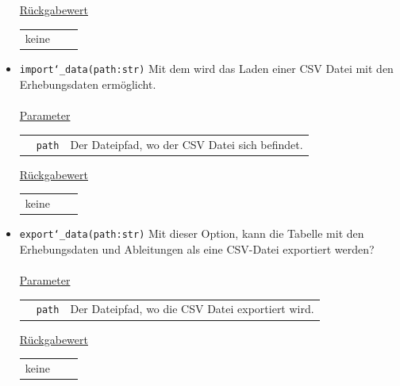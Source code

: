 \documentclass{article}
\begin{document}
\begin{itemize}
\underline{{Rückgabewert}}
\begin{tabular}{lll}
 keine \\
\end{tabular}

\item \texttt{import\char`_data(path:str)} \newline Mit dem wird das Laden einer CSV Datei mit den Erhebungsdaten ermöglicht.
\\\\
\underline{{Parameter}}
\begin{tabular}{lll}
 & \texttt{path} & Der Dateipfad, wo der CSV Datei sich befindet.\\
\end{tabular}

\underline{{Rückgabewert}}
\begin{tabular}{lll}
 keine \\
\end{tabular}

\item \texttt{export\char`_data(path:str)} \newline Mit dieser Option, kann die Tabelle mit den Erhebungsdaten und Ableitungen als eine CSV-Datei exportiert werden?
\\\\
\underline{{Parameter}}
\begin{tabular}{lll}
 & \texttt{path} & Der Dateipfad, wo die CSV Datei exportiert wird. \\
\end{tabular}

\underline{{Rückgabewert}}
\begin{tabular}{lll}
 keine \\
\end{tabular}
\end{itemize}
\end{document}
